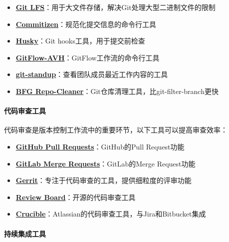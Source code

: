 \begin{itemize}
\tightlist
\item
  \textbf{\href{https://git-lfs.github.com/}{Git
  LFS}}：用于大文件存储，解决Git处理大型二进制文件的限制
\item
  \textbf{\href{http://commitizen.github.io/cz-cli/}{Commitizen}}：规范化提交信息的命令行工具
\item
  \textbf{\href{https://typicode.github.io/husky/}{Husky}}：Git
  hooks工具，用于提交前检查
\item
  \textbf{\href{https://github.com/petervanderdoes/gitflow-avh}{GitFlow-AVH}}：GitFlow工作流的命令行工具
\item
  \textbf{\href{https://github.com/kamranahmedse/git-standup}{git-standup}}：查看团队成员最近工作内容的工具
\item
  \textbf{\href{https://rtyley.github.io/bfg-repo-cleaner/}{BFG
  Repo-Cleaner}}：Git仓库清理工具，比git-filter-branch更快
\end{itemize}

\paragraph{代码审查工具}\label{ux4ee3ux7801ux5ba1ux67e5ux5de5ux5177}

代码审查是版本控制工作流中的重要环节，以下工具可以提高审查效率：

\begin{itemize}
\tightlist
\item
  \textbf{\href{https://docs.github.com/en/github/collaborating-with-issues-and-pull-requests}{GitHub
  Pull Requests}}：GitHub的Pull Request功能
\item
  \textbf{\href{https://docs.gitlab.com/ee/user/project/merge_requests/}{GitLab
  Merge Requests}}：GitLab的Merge Request功能
\item
  \textbf{\href{https://www.gerritcodereview.com/}{Gerrit}}：专注于代码审查的工具，提供细粒度的评审功能
\item
  \textbf{\href{https://www.reviewboard.org/}{Review
  Board}}：开源的代码审查工具
\item
  \textbf{\href{https://www.atlassian.com/software/crucible}{Crucible}}：Atlassian的代码审查工具，与Jira和Bitbucket集成
\end{itemize}

\paragraph{持续集成工具}\label{ux6301ux7eedux96c6ux6210ux5de5ux5177}

